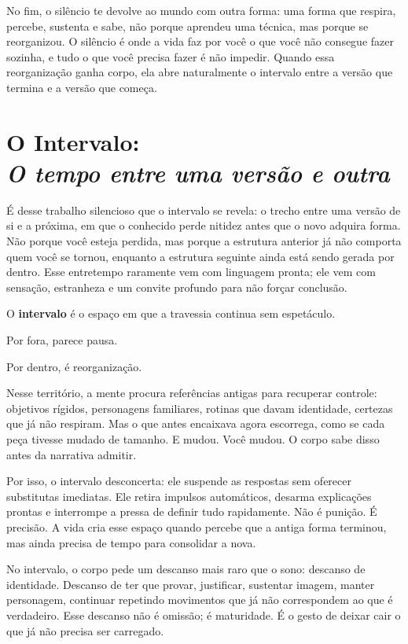 \documentclass[12pt]{book}
\begin{document}
No fim, o silêncio te devolve ao mundo com outra forma: uma forma que respira, percebe, sustenta e sabe, não porque aprendeu uma técnica, mas porque se reorganizou. O silêncio é onde a vida faz por você o que você não consegue fazer sozinha, e tudo o que você precisa fazer é não impedir. Quando essa reorganização ganha corpo, ela abre naturalmente o intervalo entre a versão que termina e a versão que começa.

\chapter[O Intervalo: O tempo entre uma versão e outra]{O Intervalo:\\[0.4ex]\large\itshape O tempo entre uma versão e outra}

É desse trabalho silencioso que o intervalo se revela: o trecho entre uma versão de si e a próxima, em que o conhecido perde nitidez antes que o novo adquira forma. Não porque você esteja perdida, mas porque a estrutura anterior já não comporta quem você se tornou, enquanto a estrutura seguinte ainda está sendo gerada por dentro. Esse entretempo raramente vem com linguagem pronta; ele vem com sensação, estranheza e um convite profundo para não forçar conclusão.

O \textbf{intervalo} é o espaço em que a travessia continua sem espetáculo.

Por fora, parece pausa.

Por dentro, é reorganização.

Nesse território, a mente procura referências antigas para recuperar controle: objetivos rígidos, personagens familiares, rotinas que davam identidade, certezas que já não respiram. Mas o que antes encaixava agora escorrega, como se cada peça tivesse mudado de tamanho. E mudou. Você mudou. O corpo sabe disso antes da narrativa admitir.

Por isso, o intervalo desconcerta: ele suspende as respostas sem oferecer substitutas imediatas. Ele retira impulsos automáticos, desarma explicações prontas e interrompe a pressa de definir tudo rapidamente. Não é punição. É precisão. A vida cria esse espaço quando percebe que a antiga forma terminou, mas ainda precisa de tempo para consolidar a nova.

No intervalo, o corpo pede um descanso mais raro que o sono: descanso de identidade. Descanso de ter que provar, justificar, sustentar imagem, manter personagem, continuar repetindo movimentos que já não correspondem ao que é verdadeiro. Esse descanso não é omissão; é maturidade. É o gesto de deixar cair o que já não precisa ser carregado.
\end{document}
